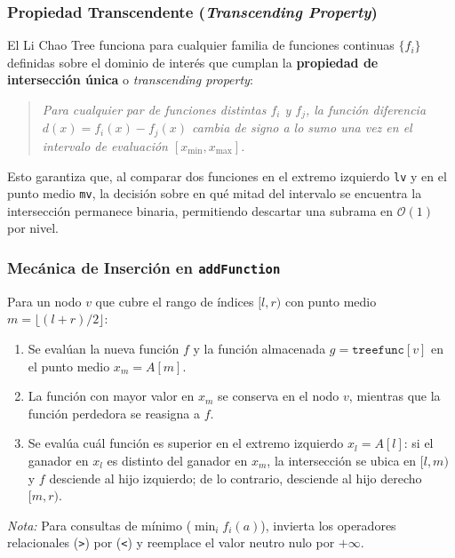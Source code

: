 \begin{extended}
    \subsubsection*{Propiedad Transcendente (\textit{Transcending Property})}
    El Li Chao Tree funciona para cualquier familia de funciones continuas $\{f_i\}$ definidas sobre el dominio de interés que cumplan la \textbf{propiedad de intersección única} o \textit{transcending property}:
    \begin{quote}
    \textit{Para cualquier par de funciones distintas $f_i$ y $f_j$, la función diferencia $d(x) = f_i(x) - f_j(x)$ cambia de signo a lo sumo una vez en el intervalo de evaluación $[x_{\min}, x_{\max}]$.}
    \end{quote}
    Esto garantiza que, al comparar dos funciones en el extremo izquierdo \texttt{lv} y en el punto medio \texttt{mv}, la decisión sobre en qué mitad del intervalo se encuentra la intersección permanece binaria, permitiendo descartar una subrama en $\mathcal{O}(1)$ por nivel.

    \subsubsection*{Mecánica de Inserción en \texttt{addFunction}}
    Para un nodo $v$ que cubre el rango de índices $[l, r)$ con punto medio $m = \lfloor(l+r)/2\rfloor$:
    \begin{enumerate}
        \item Se evalúan la nueva función $f$ y la función almacenada $g = \texttt{treefunc}[v]$ en el punto medio $x_m = A[m]$.
        \item La función con mayor valor en $x_m$ se conserva en el nodo $v$, mientras que la función perdedora se reasigna a $f$.
        \item Se evalúa cuál función es superior en el extremo izquierdo $x_l = A[l]$: si el ganador en $x_l$ es distinto del ganador en $x_m$, la intersección se ubica en $[l, m)$ y $f$ desciende al hijo izquierdo; de lo contrario, desciende al hijo derecho $[m, r)$.
    \end{enumerate}
    \textit{Nota:} Para consultas de mínimo ($\min_i f_i(a)$), invierta los operadores relacionales (\texttt{>}) por (\texttt{<}) y reemplace el valor neutro nulo por $+\infty$.
\end{extended}





